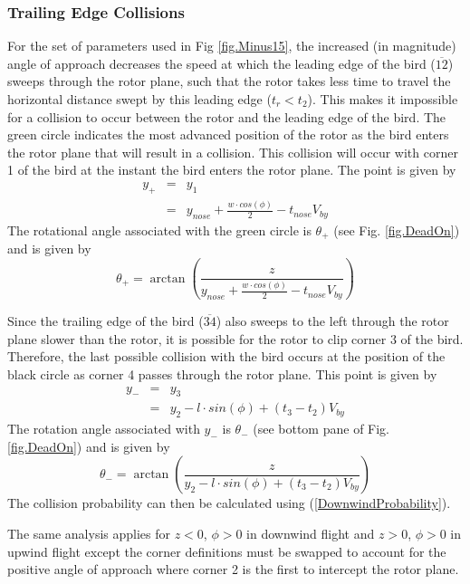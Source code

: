 \documentclass[10pt,conference]{IEEEtran}
\begin{document}
\subsubsection{Trailing Edge Collisions} For the set of parameters used in Fig \ref{fig.Minus15}, the increased (in magnitude) angle of
approach decreases the speed at which the leading edge of the bird ($\overline{12}$) sweeps through the rotor plane,
such that the rotor takes less time to travel the horizontal distance swept by this leading edge ($t_r<t_2$). This
makes it impossible for a collision to occur between the rotor and the leading edge of the bird. The green circle
indicates the most advanced position of the rotor as the bird enters the rotor plane that will result in a collision.
This collision will occur with corner 1 of the bird at the instant the bird enters the rotor plane. The point is given
by
\begin{eqnarray}
    \nonumber y_+ &=& y_1\\
    &=& y_{nose}+\frac{w \cdot cos(\phi)}{2}-t_{nose}V_{by}
\end{eqnarray}
The rotational angle associated with the green circle is $\theta_+$ (see Fig. \ref{fig.DeadOn}) and is given by
\begin{equation}
    \theta_+ = \arctan\left(\frac{z}{y_{nose}+\frac{w \cdot cos(\phi)}{2}-t_{nose}V_{by}}\right)
\end{equation}

Since the trailing edge of the bird ($\overline{34}$) also sweeps to the left through the rotor plane slower than the
rotor, it is possible for the rotor to clip corner 3 of the bird. Therefore, the last possible collision with the bird
occurs at the position of the black circle as corner 4 passes through the rotor plane. This point is given by
\begin{eqnarray}
    \nonumber y_- &=& y_3\\
    &=& y_2-l \cdot sin(\phi) + (t_3-t_2)V_{by}
\end{eqnarray}
The rotation angle associated with $y_-$ is $\theta_-$ (see bottom pane of Fig. \ref{fig.DeadOn}) and is given by
\begin{equation}
    \theta_- = \arctan\left(\frac{z}{y_2-l \cdot sin(\phi) + (t_3-t_2)V_{by}}\right)
\end{equation}
The collision probability can then be calculated using (\ref{DownwindProbability}).

The same analysis applies for $z<0$, $\phi>0$ in downwind flight and $z>0$, $\phi>0$ in upwind flight except the corner
definitions must be swapped to account for the positive angle of approach where corner 2 is the first to intercept the
rotor plane.
\end{document}
